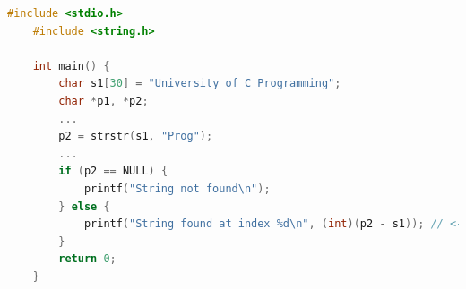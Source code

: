 \documentclass[12pt]{article}
\begin{document}
\begin{itemize}
\begin{itemize}
    \begin{lstlisting}[language=c,caption={strings\_example\_6.c}]
    #include <stdio.h>
    #include <string.h>

    int main() {
        char s1[30] = "University of C Programming";
        char *p1, *p2;
        ...
        p2 = strstr(s1, "Prog");
        ...
        if (p2 == NULL) {
            printf("String not found\n");
        } else {
            printf("String found at index %d\n", (int)(p2 - s1)); // <- Returns index 16
        }
        return 0;
    }
    \end{lstlisting}

    \end{itemize}
\end{itemize}
\end{document}
